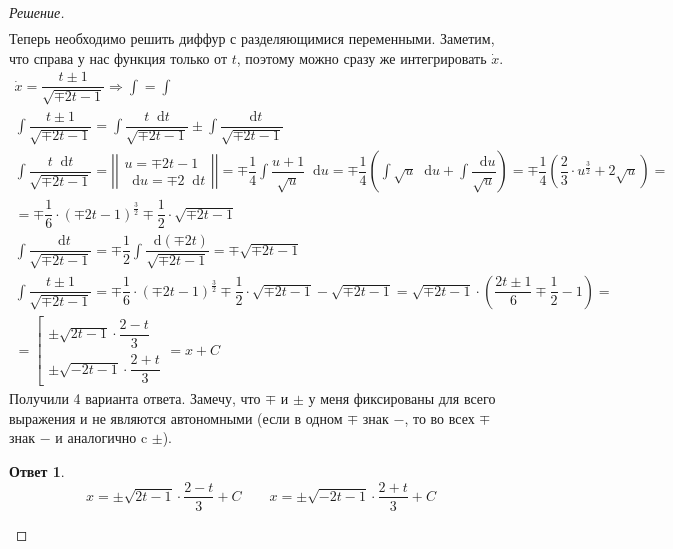 \documentclass[a4paper,12pt]{article}
\newtheorem*{ans}{Ответ}
\renewcommand*\d{\mathop{}\!\mathrm{d}}
\newcommand{\dx}{\dot{x}}
\newcommand{\bto}{\Longrightarrow}
\newcommand{\ds}{\displaystyle}
\begin{document}
\begin{proof}[Решение]
\begin{gather*}
	\end{gather*}
	Теперь необходимо решить диффур с разделяющимися переменными. Заметим, что справа у нас функция только от $t$, поэтому можно сразу же интегрировать $\dx$.
	\begin{gather*}
	\dx = \dfrac{t\pm 1}{\sqrt{\mp 2t - 1}} \bto \ds\int = \int\\
	\ds\int \dfrac{t\pm 1}{\sqrt{\mp 2t - 1}} = \ds\int \dfrac{t\d t}{\sqrt{\mp 2t - 1}} \pm \ds\int\dfrac{\d t}{\sqrt{\mp 2t - 1}} \\
	\ds\int \dfrac{t\d t}{\sqrt{\mp 2t - 1}} = \left|\left|\begin{gathered}
	u = \mp 2t - 1\\
	\d u = \mp 2\d t
	\end{gathered}\right|\right| = \mp\dfrac{1}{4}\ds\int\dfrac{u + 1}{\sqrt{u}}\d u  = \mp\dfrac{1}{4}\left(\ds\int \sqrt{u}\d u + \ds\int \dfrac{\d u}{\sqrt{u}}\right) = \mp\dfrac{1}{4}\left(\dfrac{2}{3}\cdot u^{\frac{3}{2}} + 2\sqrt{u}\right) = \\
	= \mp\dfrac{1}{6}\cdot (\mp 2t - 1)^\frac{3}{2} \mp \dfrac{1}{2}\cdot \sqrt{\mp 2t - 1}\\
	\ds\int\dfrac{\d t}{\sqrt{\mp 2t - 1}} = \mp\dfrac{1}{2}\ds\int\dfrac{\d(\mp 2t) }{\sqrt{\mp 2t - 1}} = \mp\sqrt{\mp 2t - 1}\\
	\ds\int \dfrac{t\pm 1}{\sqrt{\mp 2t - 1}} = \mp\dfrac{1}{6}\cdot (\mp 2t - 1)^\frac{3}{2} \mp \dfrac{1}{2}\cdot \sqrt{\mp 2t - 1} - \sqrt{\mp 2t - 1} = \sqrt{\mp 2t - 1}\cdot \left(\dfrac{2t \pm 1}{6} \mp \dfrac{1}{2} - 1\right) = \\
	= \left[\begin{gathered}
	\pm\sqrt{2t - 1}\cdot \dfrac{2 - t}{3}\\
	\pm\sqrt{-2t - 1}\cdot \dfrac{2 + t}{3}
	\end{gathered}\right. = x + C	
	\end{gather*}
	Получили 4 варианта ответа. Замечу, что $\mp$ и $\pm$ у меня фиксированы для всего выражения и не являются автономными (если в одном $\mp$ знак $-$, то во всех $\mp$ знак $-$ и аналогично c $\pm$).
	\begin{ans}
		\[x = \pm\sqrt{2t - 1}\cdot \dfrac{2 - t}{3} + C \qquad x = \pm\sqrt{-2t - 1}\cdot \dfrac{2 + t}{3} + C\]	
	\end{ans}
	
\end{proof}
\end{document}
